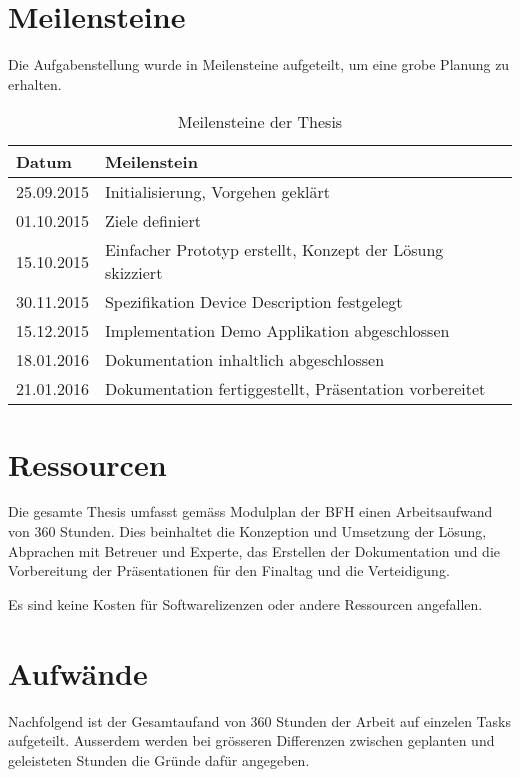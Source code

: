 \section{Meilensteine}

Die Aufgabenstellung wurde in Meilensteine aufgeteilt, um eine grobe Planung zu erhalten.

\begin{table}[H]
\begin{tabularx}{\textwidth}{|l|X|}

 \hline \rowcolor{lightgray}
 {\bf Datum } & {\bf Meilenstein } \\  \hline
 
 25.09.2015  &   Initialisierung, Vorgehen geklärt      \\ \hline
 01.10.2015  &   Ziele definiert      \\ \hline
 15.10.2015  &   Einfacher Prototyp erstellt, Konzept der Lösung skizziert     \\ \hline
 30.11.2015  &   Spezifikation Device Description festgelegt     \\ \hline
 15.12.2015  &   Implementation Demo Applikation abgeschlossen     \\ \hline
 18.01.2016  &   Dokumentation inhaltlich abgeschlossen      \\ \hline
 21.01.2016  &   Dokumentation fertiggestellt, Präsentation vorbereitet     \\ \hline
 
\end{tabularx}
\caption{Meilensteine der Thesis}
\end{table}


\section{Ressourcen}

Die gesamte Thesis umfasst gemäss Modulplan der BFH einen Arbeitsaufwand von 360 Stunden. Dies beinhaltet die Konzeption und Umsetzung der Lösung, Abprachen mit Betreuer und Experte, das Erstellen der Dokumentation und die Vorbereitung der Präsentationen für den Finaltag und die Verteidigung.

Es sind keine Kosten für Softwarelizenzen oder andere Ressourcen angefallen.


\section{Aufwände}
Nachfolgend ist der Gesamtaufand von 360 Stunden der Arbeit auf einzelen Tasks aufgeteilt. Ausserdem werden bei grösseren Differenzen zwischen geplanten und geleisteten Stunden die Gründe dafür angegeben.

